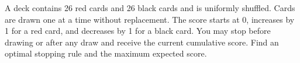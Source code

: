 A deck contains 26 red cards and 26 black cards and is uniformly shuffled. Cards are drawn one at a time without replacement. The score starts at 0, increases by 1 for a red card, and decreases by 1 for a black card. You may stop before drawing or after any draw and receive the current cumulative score. Find an optimal stopping rule and the maximum expected score.
